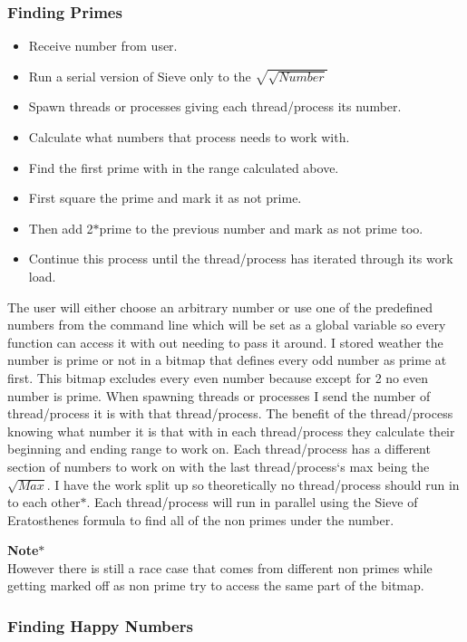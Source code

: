 \documentclass[letterpaper,10pt,notitlepage,fleqn]{article}
\begin{document}
\subsubsection*{Finding Primes}

\begin{itemize}
\item Receive number from user.
\item Run a serial version of Sieve only to the $\sqrt{\sqrt{Number}}$
\item Spawn threads or processes giving each thread/process its number.
\item Calculate what numbers that process needs to work with.
\item Find the first prime with in the range calculated above.
\item First square the prime and mark it as not prime.
\item Then add 2$\ast$prime to the previous number and mark as not prime too.
\item Continue this process until the thread/process has iterated through its work load.
\end{itemize}

The user will either choose an arbitrary number or use one of the predefined numbers from the command line which will be set as a global variable so every function can access it with out needing to pass it around. I stored weather the number is prime or not in a bitmap that defines every odd number as prime at first. This bitmap excludes every even number because except for 2 no even number is prime. When spawning threads or processes I send the number of thread/process it is with that thread/process. The benefit of the thread/process knowing what number it is that with in each thread/process they calculate their beginning and ending range to work on. Each thread/process has a different section of numbers to work on with the last thread/process`s max being the $\sqrt{Max}$. I have the work split up so theoretically no thread/process should run in to each other$\ast$. Each thread/process will run in parallel using the Sieve of Eratosthenes formula to find all of the non primes under the number. 

\textbf{Note$\ast$} \\
However there is still a race case that comes from different non primes while getting marked off as non prime try to access the same part of the bitmap.

\subsubsection*{Finding Happy Numbers}       
 
\end{document}
